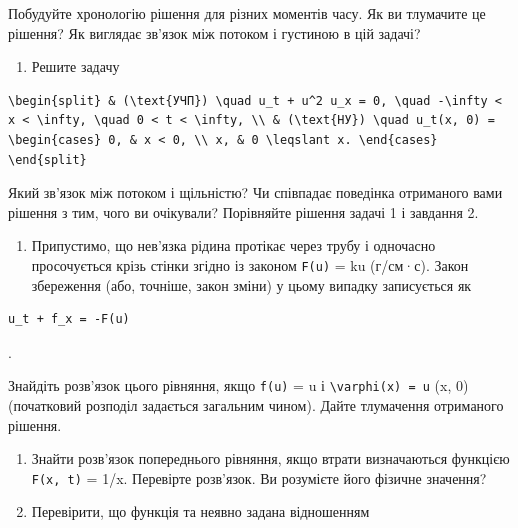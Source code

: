 \documentclass[
  ukrainian,
]{article}
\providecommand{\tightlist}{%
  \setlength{\itemsep}{0pt}\setlength{\parskip}{0pt}}
\begin{document}
Побудуйте хронологію рішення для різних моментів часу. Як ви тлумачите
це рішення? Як виглядає зв'язок між потоком і густиною в цій задачі?

\begin{enumerate}
\def\labelenumi{\arabic{enumi}.}
\setcounter{enumi}{1}
\tightlist
\item
  Решите задачу
\end{enumerate}

\begin{verbatim}
\begin{split} & (\text{УЧП}) \quad u_t + u^2 u_x = 0, \quad -\infty < x < \infty, \quad 0 < t < \infty, \\ & (\text{НУ}) \quad u_t(x, 0) = \begin{cases} 0, & x < 0, \\ x, & 0 \leqslant x. \end{cases} \end{split}
\end{verbatim}

Який зв'язок між потоком і щільністю? Чи співпадає поведінка отриманого
вами рішення з тим, чого ви очікували? Порівняйте рішення задачі 1 і
завдання 2.

\begin{enumerate}
\def\labelenumi{\arabic{enumi}.}
\setcounter{enumi}{2}
\tightlist
\item
  Припустимо, що нев'язка рідина протікає через трубу і одночасно
  просочується крізь стінки згідно із законом \texttt{F(u)} = ku
  (г/см·с). Закон збереження (або, точніше, закон зміни) у цьому випадку
  записується як
\end{enumerate}

\begin{verbatim}
u_t + f_x = -F(u)
\end{verbatim}

.

Знайдіть розв'язок цього рівняння, якщо \texttt{f(u)} = u і
\texttt{\textbackslash{}varphi(x)\ =\ u} (x, 0) (початковий розподіл
задається загальним чином). Дайте тлумачення отриманого рішення.

\begin{enumerate}
\def\labelenumi{\arabic{enumi}.}
\setcounter{enumi}{3}
\item
  Знайти розв'язок попереднього рівняння, якщо втрати визначаються
  функцією \texttt{F(x,\ t)} = 1/x. Перевірте розв'язок. Ви розумієте
  його фізичне значення?
\item
  Перевірити, що функція та неявно задана відношенням
\end{enumerate}
\end{document}
